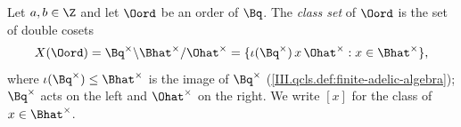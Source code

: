 Let $a,b\in\Z$ and let $\Oord$ be an order of $\Bq$. The \emph{class set} of $\Oord$ is the set of double cosets
\[
  X(\Oord)=\Bq^\times\backslash\Bhat^\times/\Ohat^\times=\{\iota(\Bq^\times)\,x\,\Ohat^\times:x\in\Bhat^\times\},
\]
where $\iota(\Bq^\times)\le\Bhat^\times$ is the image of $\Bq^\times$ (\cref{III.qcls.def:finite-adelic-algebra}); $\Bq^\times$ acts on the left and
$\Ohat^\times$ on the right. We write $[x]$ for the class of $x\in\Bhat^\times$.
